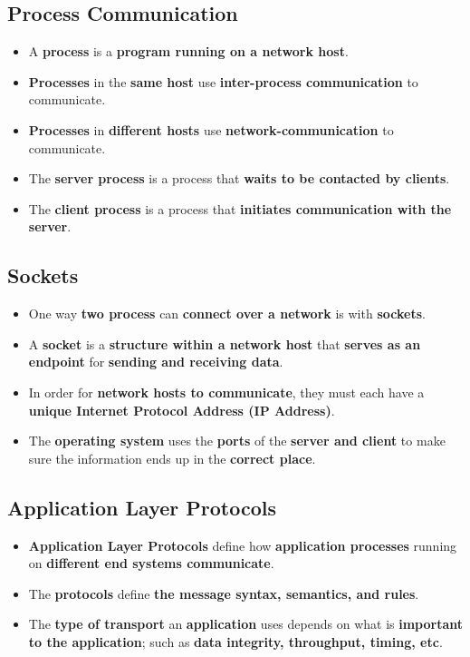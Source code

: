 \documentclass{article}
\begin{document}
    \subsection*{Process Communication}
    \begin{itemize}
        \item A \textbf{process} is a \textbf{program running on a network host}.
        \item \textbf{Processes} in the \textbf{same host} use \textbf{inter-process communication} to communicate.
        \item \textbf{Processes} in \textbf{different hosts} use \textbf{network-communication} to communicate.
        \item The \textbf{server process} is a process that \textbf{waits to be contacted by clients}.
        \item The \textbf{client process} is a process that \textbf{initiates communication with the server}.
    \end{itemize}

    \subsection*{Sockets}
    \begin{itemize}
        \item One way \textbf{two process} can \textbf{connect over a network} is with \textbf{sockets}.
        \item A \textbf{socket} is a \textbf{structure within a network host} that \textbf{serves as an endpoint} for \textbf{sending and receiving data}.
        \item In order for \textbf{network hosts to communicate}, they must each have a \textbf{unique Internet Protocol Address (IP Address)}.
        \item The \textbf{operating system} uses the \textbf{ports} of the \textbf{server and client} to make sure the information ends up in the \textbf{correct place}.
    \end{itemize}

    \subsection*{Application Layer Protocols}
    \begin{itemize}
        \item \textbf{Application Layer Protocols} define how \textbf{application processes} running on \textbf{different end systems communicate}.
        \item The \textbf{protocols} define \textbf{the message syntax, semantics, and rules}.
        \item The \textbf{type of transport} an \textbf{application} uses depends on what is \textbf{important to the application}; such as \textbf{data integrity, throughput, timing, etc}.
    \end{itemize}
\end{document}
